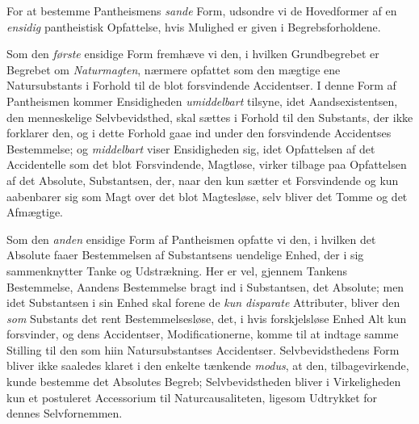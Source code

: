 For at bestemme Pantheismens \emph{sande} Form, udsondre vi de Hovedformer af
en \emph{ensidig} pantheistisk Opfattelse, hvis Mulighed er given i
Begrebsforholdene.

Som den \emph{første} ensidige Form fremhæve vi den, i hvilken Grundbegrebet er
Begrebet om \emph{Naturmagten}, nærmere opfattet som den mægtige ene
Natursubstants i Forhold til de blot forsvindende Accidentser. I denne Form af
Pantheismen kommer Ensidigheden \emph{umiddelbart} tilsyne, idet
Aandsexistentsen, den menneskelige Selvbevidsthed, skal sættes i Forhold til
den Substants, der ikke forklarer den, og i dette Forhold gaae ind under den
forsvindende Accidentses Bestemmelse; og \emph{middelbart} viser Ensidigheden
sig, idet Opfattelsen af det Accidentelle som det blot Forsvindende, Magtløse,
virker tilbage paa Opfattelsen af det Absolute, Substantsen, der, naar den kun
sætter et Forsvindende og kun aabenbarer sig som Magt over det blot Magtesløse,
selv bliver det Tomme og det Afmægtige.

Som den \emph{anden} ensidige Form af Pantheismen opfatte vi den, i hvilken det
Absolute faaer Bestemmelsen af Substantsens uendelige Enhed, der i sig
sammenknytter Tanke og Udstrækning. Her er vel, gjennem Tankens Bestemmelse,
Aandens Bestemmelse bragt ind i Substantsen, det Absolute; men idet Substantsen
i sin Enhed skal forene de \emph{kun disparate} Attributer, bliver den
\emph{som} Substants det rent Bestemmelsesløse, det, i hvis forskjelsløse Enhed
Alt kun forsvinder, og dens Accidentser, Modificationerne, komme til at indtage
samme Stilling til den som hiin Natursubstantses Accidentser. Selvbevidsthedens
Form bliver ikke saaledes klaret i den enkelte tænkende \textit{modus}, at den,
tilbagevirkende, kunde bestemme det Absolutes Begreb; Selvbevidstheden bliver
 i Virkeligheden kun et postuleret Accessorium til Naturcausaliteten, ligesom
Udtrykket for dennes Selvfornemmen.


